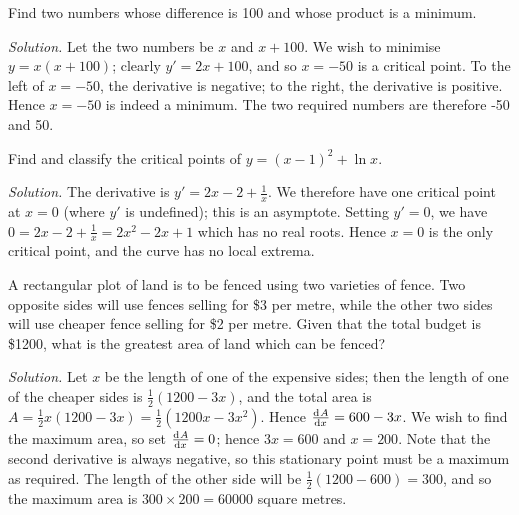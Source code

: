 \begin{ex}
  Find two numbers whose difference is 100 and whose product is a minimum.

  \textit{Solution.} Let the two numbers be $ x $ and $ x + 100 $. We wish to minimise $ y = x(x + 100) $;
  clearly $ y' = 2x + 100 $, and so $ x = -50 $ is a critical point. To the left of $ x = -50 $, the derivative
  is negative; to the right, the derivative is positive. Hence $ x = -50 $ is indeed a minimum. The two required
  numbers are therefore -50 and 50.
\end{ex}

\begin{ex}
  Find and classify the critical points of $ y = (x - 1)^2 + \ln x $.

  \textit{Solution.} The derivative is $ y' = 2x - 2 + \frac{1}{x} $. We therefore have one critical
  point at $ x = 0 $ (where $ y' $ is undefined); this is an asymptote.
  Setting $ y' = 0 $, we have $ 0 = 2x - 2 + \frac{1}{x} = 2x^2 - 2x + 1 $ which has no real roots. Hence $ x = 0 $ is
  the only critical point, and the curve has no local extrema.
\end{ex}

\begin{ex}
  A rectangular plot of land is to be fenced using two varieties of fence. Two opposite sides will
  use fences selling for \$3 per metre, while the other two sides will use cheaper fence selling for \$2 per metre.
  Given that the total budget is \$1200, what is the greatest area of land which can be fenced?

  \textit{Solution.} Let $ x $ be the length of one of the expensive sides; then the length of one of the cheaper
                    sides is $ \frac{1}{2}(1200 - 3x) $, and the total area is $ A = \frac{1}{2} x (1200 - 3x) = \frac{1}{2}(1200x - 3x^2) $.
                    Hence $ \od{A}{x} = 600 - 3x $. We wish to find the maximum area, so set $ \od{A}{x} = 0 $; hence $ 3x = 600 $ and $ x = 200 $.
                    Note that the second derivative is always negative, so this stationary point must be a maximum as required. The length
                    of the other side will be $ \frac{1}{2}(1200 - 600) = 300 $, and so the maximum area is $ 300 \times 200 = 60000 $ square metres.
\end{ex}

